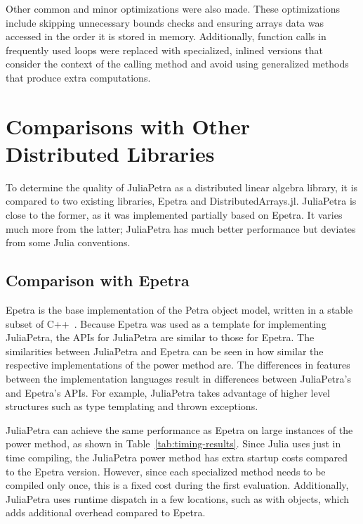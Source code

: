 \documentclass[acmsmall]{acmart}
\newcommand{\snippet}[1]{\texttt{\detokenize{#1}}}
\begin{document}
	Other common and minor optimizations were also made.
	These optimizations include skipping unnecessary bounds checks
	and ensuring arrays data was accessed in the order it is stored in memory.
	Additionally, function calls in frequently used loops were replaced with specialized, inlined versions that consider the context of the calling method and avoid using generalized methods that produce extra computations.
	
	\section{Comparisons with Other Distributed Libraries}
	
	To determine the quality of JuliaPetra as a distributed linear algebra library, it is compared to two existing libraries, Epetra and DistributedArrays.jl.
	JuliaPetra is close to the former, as it was implemented partially based on Epetra.
	It varies much more from the latter; JuliaPetra has much better performance but deviates from some Julia conventions.
	
	\subsection{Comparison with Epetra}
	
	Epetra is the base implementation of the Petra object model,
	written in a stable subset of C++~\cite{Heroux:2005:Trilinos}.
	Because Epetra was used as a template for implementing JuliaPetra,
	the APIs for JuliaPetra are similar to those for Epetra.
	The similarities between JuliaPetra and Epetra can be seen in how similar the respective implementations
	of the power method are.
	The differences in features between the implementation languages result in differences
	between JuliaPetra's and Epetra's APIs.
	For example, JuliaPetra takes advantage of higher level structures
	such as type templating and thrown exceptions.
	
	JuliaPetra can achieve the same performance as Epetra on large instances of the power method, as shown in Table~\ref{tab:timing-results}.
	Since Julia uses just in time compiling, the JuliaPetra power method has extra startup costs compared to
	the Epetra version. However, since each specialized method needs to be compiled only once,
	this is a fixed cost during the first evaluation.
	Additionally, JuliaPetra uses runtime dispatch in a few locations, such as with
	\snippet{Comm} objects, which adds additional overhead compared to Epetra.
	
\end{document}

